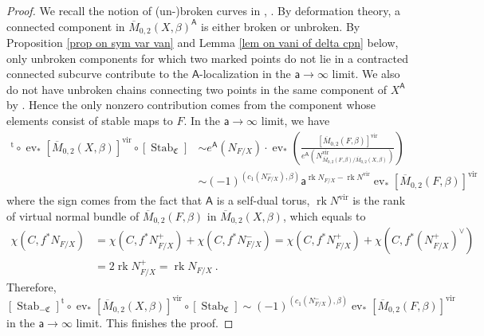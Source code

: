 \documentclass[10pt]{amsart}
\theoremstyle{definition}
\numberwithin{equation}{section}
\newcommand{\fC}{\mathfrak{C}}
\newcommand{\vir}{\mathrm{vir}}
\newcommand{\sA}{\mathsf{A}}
\newcommand{\sT}{\mathsf{T}}
\newcommand{\sw}{\mathsf{w}}
\newcommand{\ev}{\operatorname{ev}}
\newcommand{\rk}{\operatorname{rk}}
\newcommand{\Stab}{\operatorname{Stab}}
\newcommand{\yl}[1]{\textcolor{blue}{$[$ Yalong: #1 $]$}}
\begin{document}
\begin{proof}
We recall the notion of (un-)broken curves in \cite[\S 7.3]{MO}, \cite[\S 3.8.2]{OP}. By deformation theory, a connected component in $\overline{M}_{0,2}(X,\beta)^{\sA}$ is either broken or unbroken. By Proposition \ref{prop on sym var van} and Lemma \ref{lem on vani of delta cpn} below, only unbroken components for which two marked points do not lie in a contracted connected subcurve contribute to the $\sA$-localization in the $\mathsf a\to \infty$ limit.
We also do not have unbroken chains connecting two points in the same component of $X^\sA$ by \cite[Lem.~7.3.3]{MO}.
Hence the only nonzero contribution comes from the component whose elements consist of stable maps to $F$. In the $\mathsf a\to \infty$ limit, we have
\begin{align*}
[\Stab_{-\fC}]^{\mathrm{t}}\circ\ev_*[\overline{M}_{0,2}(X,\beta)]^{\vir}\circ[\Stab_\fC]&\sim e^\sA(N_{F/X})\cdot\ev_*\left(\frac{[\overline{M}_{0,2}(F,\beta)]^{\vir}}{e^\sA\left(N^{\vir}_{\overline{M}_{0,2}(F,\beta)/\overline{M}_{0,2}(X,\beta)}\right)}\right)\\
&\sim (-1)^{(c_1(N^-_{F/X}),\beta)}\mathsf a^{\rk N_{F/X}-\rk N^{\vir}}\ev_*[\overline{M}_{0,2}(F,\beta)]^{\vir}
\end{align*}
where the sign comes from the fact that $\sA$ is a self-dual torus, 
$\rk N^{\vir}$ is the rank of virtual normal bundle of $\overline{M}_{0,2}(F,\beta)$ in $\overline{M}_{0,2}(X,\beta)$, which equals to 
\begin{align*}
\chi(C,f^*N_{F/X})&=\chi(C,f^*N^+_{F/X})+\chi(C,f^*N^-_{F/X})=\chi(C,f^*N^+_{F/X})+\chi(C,f^*(N^+_{F/X})^\vee)\\
&=2\rk N^+_{F/X}=\rk N_{F/X}\:.
\end{align*}
Therefore, $[\Stab_{-\fC}]^{\mathrm{t}}\circ\ev_*[\overline{M}_{0,2}(X,\beta)]^{\vir}\circ[\Stab_\fC]\sim (-1)^{(c_1(N^-_{F/X}),\beta)}\ev_*[\overline{M}_{0,2}(F,\beta)]^{\vir}$ in the $\mathsf a\to \infty$ limit. This finishes the proof.
\end{proof}
\end{document}
